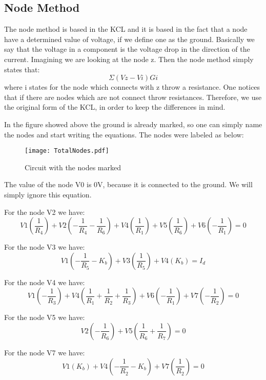 \subsection{Node Method}
The node method is based in the KCL and it is based in the fact that a node have a determined value of voltage, if we define one as the ground. Basically we say that the voltage in a component is the voltage drop in the direction of the current. Imagining we are looking at the node z. Then the node method simply states that:
\begin{equation}
  \Sigma(Vz-Vi)Gi
\end{equation}
where i states for the node which connects with z throw a resistance. One notices that if there are nodes which are not connect throw resistances. Therefore, we use the original form of the KCL, in order to keep the differences in mind.
\par
In the figure showed above the ground is already marked, so one can simply name the nodes and start writing the equations. The nodes were labeled as  below:
\begin{figure}[H] \centering
\texttt{[image: TotalNodes.pdf]}
\caption{Circuit with the nodes marked}
\label{TotalNodes}
\end{figure}

The value of the node V0 is 0V, because it is connected to the ground.
We will simply ignore this equation.

For the node V2 we have:
\begin{equation}
V1(\frac{1}{R_4})+V2(-\frac{1}{R_4}-\frac{1}{R_6})+V4(\frac{1}{R_1})+V5(\frac{1}{R_6})+V6(-\frac{1}{R_1})=0  
\end{equation}

For the node V3 we have:
\begin{equation}
  V1(-\frac{1}{R_5}-K_b)+V3(\frac{1}{R_5})+V4(K_b)=I_d
  \end{equation}


For the node V4 we have:
\begin{equation}
V1(-\frac{1}{R_3})+V4(\frac{1}{R_1}+\frac{1}{R_2}+\frac{1}{R_3})+V6(-\frac{1}{R_1})+V7(-\frac{1}{R_2})=0  
\end{equation}

For the node V5 we have:
\begin{equation}
  V2(-\frac{1}{R_6})+V5(\frac{1}{R_6}+\frac{1}{R_7})=0
\end{equation}

For the node V7 we have:
\begin{equation}
  V1(K_b)+V4(-\frac{1}{R_2}-K_b)+V7(\frac{1}{R_2})=0
  \end{equation}

